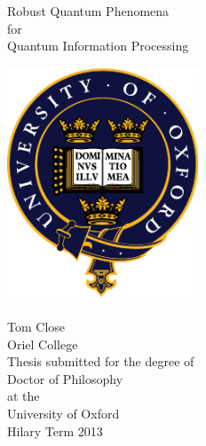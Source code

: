 \pagestyle{empty}
\vspace*{0.5cm}
\begin{center}
  
  {\Huge Robust Quantum Phenomena}\\[0.5cm] 
  {\Huge for}\\[0.5cm] 
  {\Huge Quantum Information Processing}\\[2cm]

  \centerline{\includegraphics[height=7cm]{Assets/OULogo}}  \vspace{2cm}
  
  {\Large{Tom Close}}\\
  {\Large{Oriel College}}\\[1.5cm]
 
  Thesis submitted for the degree of \\
  Doctor of Philosophy\\
  at the\\
  University of Oxford\\
  Hilary Term 2013

\end{center}
